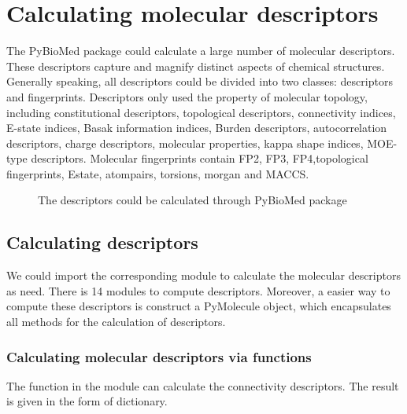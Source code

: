 \documentclass[letterpaper,10pt,english]{sphinxmanual}
\begin{document}
\section{Calculating molecular descriptors}
\label{User_guide:calculating-molecular-descriptors}
The PyBioMed package could calculate a large number of molecular descriptors. These descriptors capture and magnify distinct aspects of chemical structures. Generally speaking, all descriptors could be divided into two classes: descriptors and fingerprints. Descriptors only used the property of molecular topology, including constitutional descriptors, topological descriptors, connectivity indices, E-state indices, Basak information indices, Burden descriptors, autocorrelation descriptors, charge descriptors, molecular properties, kappa shape indices, MOE-type descriptors. Molecular fingerprints contain FP2, FP3, FP4,topological fingerprints, Estate, atompairs, torsions, morgan and MACCS.
\begin{figure}[htbp]
\centering
\capstart

\noindent{}
\caption{The descriptors could be calculated through PyBioMed package}\label{User_guide:id1}\end{figure}


\subsection{Calculating descriptors}
\label{User_guide:calculating-descriptors}
We could import the corresponding module to calculate the molecular descriptors as need. There is 14 modules to compute descriptors. Moreover, a easier way to compute these descriptors is construct a PyMolecule object, which encapsulates all methods for the calculation of descriptors.


\subsubsection{Calculating molecular descriptors via functions}
\label{User_guide:calculating-molecular-descriptors-via-functions}
The  function in the {\hyperref[reference/connectivity:module\string-connectivity]{}} module can calculate the connectivity descriptors. The result is given in the form of dictionary.
\end{document}
